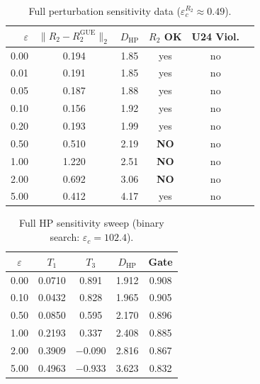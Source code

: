 \documentclass[11pt,a4paper]{article}
\theoremstyle{plain}
\theoremstyle{remark}
\newcommand{\norm}[1]{\lVert #1 \rVert}
\begin{document}
\begin{table}[H]
\centering
\begin{tabular}{rccccc}
\toprule
$\varepsilon$ & $\norm{R_2 - R_2^{\mathrm{GUE}}}_2$ & $D_{\mathrm{HP}}$ & $R_2$ OK & U24 Viol. \\
\midrule
0.00 & 0.194 & 1.85 & yes & no \\
0.01 & 0.191 & 1.85 & yes & no \\
0.05 & 0.187 & 1.88 & yes & no \\
0.10 & 0.156 & 1.92 & yes & no \\
0.20 & 0.193 & 1.99 & yes & no \\
0.50 & 0.510 & 2.19 & \textbf{NO} & no \\
1.00 & 1.220 & 2.51 & \textbf{NO} & no \\
2.00 & 0.692 & 3.06 & \textbf{NO} & no \\
5.00 & 0.412 & 4.17 & yes & no \\
\bottomrule
\end{tabular}
\caption{Full perturbation sensitivity data ($\varepsilon_c^{R_2}\approx 0.49$).}
\label{tab:full-perturbation}
\end{table}

\begin{table}[H]
\centering
\begin{tabular}{@{}ccccc@{}}
\toprule
$\varepsilon$ & $T_1$ & $T_3$ & $D_{\mathrm{HP}}$ & Gate\\
\midrule
0.00 & 0.0710 & 0.891 & 1.912 & 0.908\\
0.10 & 0.0432 & 0.828 & 1.965 & 0.905\\
0.50 & 0.0850 & 0.595 & 2.170 & 0.896\\
1.00 & 0.2193 & 0.337 & 2.408 & 0.885\\
2.00 & 0.3909 & $-$0.090 & 2.816 & 0.867\\
5.00 & 0.4963 & $-$0.933 & 3.623 & 0.832\\
\bottomrule
\end{tabular}
\caption{Full HP sensitivity sweep (binary search: $\varepsilon_c=102.4$).}
\label{tab:full-sweep}
\end{table}
\end{document}
